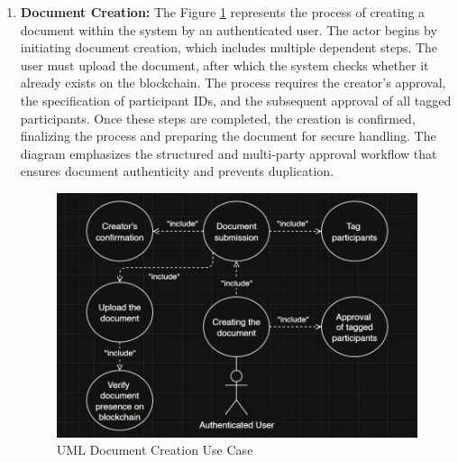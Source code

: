 \begin{enumerate}
    \item \textbf{Document Creation:} The Figure \ref{uml-use-create} represents the process of creating a document within the system by an authenticated user. The actor begins by initiating document creation, which includes multiple dependent steps. The user must upload the document, after which the system checks whether it already exists on the blockchain. The process requires the creator’s approval, the specification of participant IDs, and the subsequent approval of all tagged participants. Once these steps are completed, the creation is confirmed, finalizing the process and preparing the document for secure handling. The diagram emphasizes the structured and multi-party approval workflow that ensures document authenticity and prevents duplication.
    \begin{figure}[H]
        \centering
        \includegraphics[width=18cm]{"images/umlDiagrams/uml-use-create.png"}
        \caption{UML Document Creation Use Case}
        \label{uml-use-create}
    \end{figure}


\end{enumerate}
